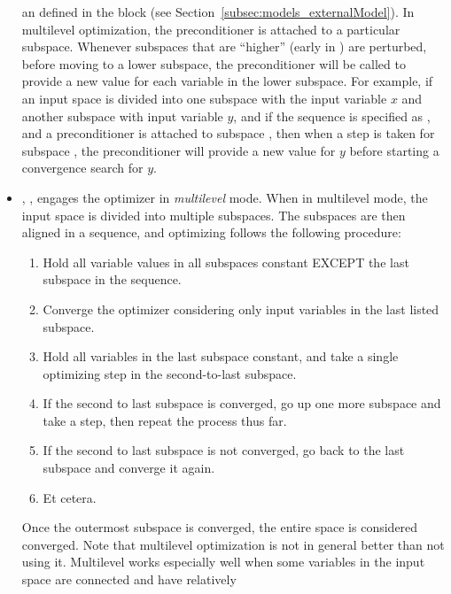 \begin{itemize}
        an  defined in the  block (see
        Section~\ref{subsec:models_externalModel}).
        In multilevel optimization, the preconditioner is attached to a particular subspace.  Whenever
        subspaces that are ``higher'' (early in ) are perturbed, before moving to a lower
        subspace, the preconditioner will be called to provide a new value for each variable in the lower
        subspace.
        For example, if an input space is divided into one subspace  with the input variable $x$ and
        another subspace  with input variable $y$, and if the sequence is specified as
        , and a preconditioner is attached to subspace , then when a step
        is taken for subspace , the preconditioner will provide a new value for $y$ before
        starting a convergence search for $y$.
\item {}, , engages the optimizer in \emph{multilevel}
        mode.  When in multilevel mode, the input space is divided into multiple subspaces.  The subspaces are
        then aligned in a sequence, and optimizing follows the following procedure:
        \begin{enumerate}
          \item Hold all variable values in all subspaces constant EXCEPT the last subspace in the sequence.
          \item Converge the optimizer considering only input variables in the last listed subspace.
          \item Hold all variables in the last subspace constant, and take a single optimizing step in the
            second-to-last subspace.
          \item If the second to last subspace is converged, go up one more subspace and take a step, then
            repeat the process thus far.
          \item If the second to last subspace is not converged, go back to the last subspace and converge it
            again.
          \item Et cetera.
        \end{enumerate}
        Once the outermost subspace is converged, the entire space is considered converged.
        Note that multilevel optimization is not in general better than not using it.  Multilevel works
        especially well when some variables in the input space are connected and have relatively

\end{itemize}
